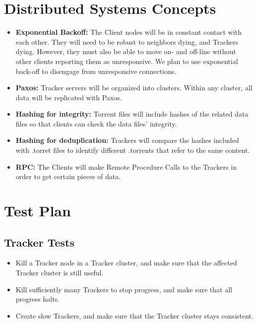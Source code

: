 \documentclass[12pt]{article}
\begin{document}
\section*{Distributed Systems Concepts}

\begin{itemize}
\item  \textbf{Exponential Backoff:} The Client nodes will be in constant
       contact with each other.
       They will need to be robust to neighbors dying, and Trackers dying.
       However, they must also be able to move on- and off-line without other
       clients reporting them as unresponsive.
       We plan to use exponential back-off to disengage from unresponsive
       connections.
\item  \textbf{Paxos:} Tracker servers will be organized into clusters.
       Within any cluster, all data will be replicated with Paxos.
\item  \textbf{Hashing for integrity:} Torrent files will include hashes of
       the related data files so that clients can check the data files'
       integrity.
\item  \textbf{Hashing for deduplication:} Trackers will compare the hashes
       included with .torret files to identify different .torrents that refer
       to the same content.
\item  \textbf{RPC:} The Clients will make Remote Procedure Calls to the
       Trackers in order to get certain pieces of data.
\end{itemize}

\section*{Test Plan}

\subsection*{Tracker Tests}
\begin{itemize}
\item  Kill a Tracker node in a Tracker cluster,
       and make sure that the affected Tracker cluster is still useful.
\item  Kill sufficiently many Trackers to stop progress,
       and make sure that all progress halts.
\item  Create slow Trackers,
       and make sure that the Tracker cluster stays consistent.
\end{itemize}
\end{document}
